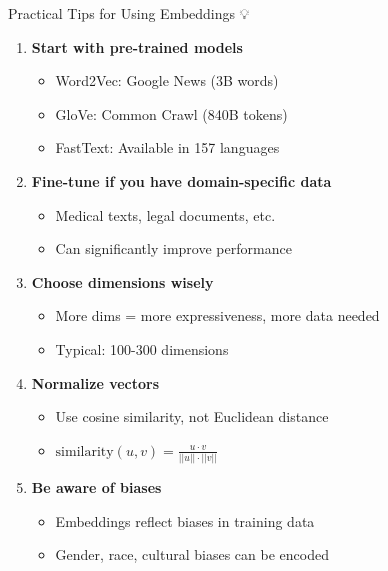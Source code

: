\documentclass[aspectratio=169]{beamer}
\begin{document}
\begin{frame}[shrink=10]{Practical Tips for Using Embeddings 💡}
\begin{enumerate}\setlength{\itemsep}{0pt}
    \item \textbf{Start with pre-trained models}
    \begin{itemize}\setlength{\itemsep}{0pt}
        \item Word2Vec: Google News (3B words)
        \item GloVe: Common Crawl (840B tokens)
        \item FastText: Available in 157 languages
    \end{itemize}

    \item \textbf{Fine-tune if you have domain-specific data}
    \begin{itemize}\setlength{\itemsep}{0pt}
        \item Medical texts, legal documents, etc.
        \item Can significantly improve performance
    \end{itemize}

    \item \textbf{Choose dimensions wisely}
    \begin{itemize}\setlength{\itemsep}{0pt}
        \item More dims = more expressiveness, more data needed
        \item Typical: 100-300 dimensions
    \end{itemize}

    \item \textbf{Normalize vectors}
    \begin{itemize}\setlength{\itemsep}{0pt}
        \item Use cosine similarity, not Euclidean distance
        \item $\text{similarity}(u,v) = \frac{u \cdot v}{||u|| \cdot ||v||}$
    \end{itemize}

    \item \textbf{Be aware of biases}
    \begin{itemize}\setlength{\itemsep}{0pt}
        \item Embeddings reflect biases in training data
        \item Gender, race, cultural biases can be encoded
    \end{itemize}
\end{enumerate}
\end{frame}
\end{document}
